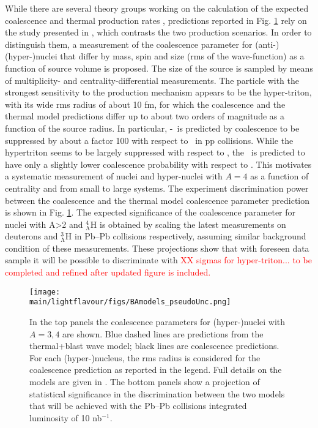 While there are several theory groups working on the calculation of the expected coalescence \cite{Scheibl:1998tk, Cho:2017dcy, Zhang:2018euf, Bazak:2018hgl, Zhao:2018lyf} and thermal production rates \cite{Andronic:2010qu, Wheaton:2004qb, Petran:2013dva}, predictions reported in Fig. \ref{fig:BAmodels} rely on the study presented in \cite{Bellini:2018epz}, which contrasts the two production scenarios. 
In order to distinguish them, a measurement of the coalescence parameter for (anti-)(hyper-)nuclei that differ by mass, spin and size (rms of the wave-function)  as a function of source volume is proposed. The size of the source is sampled by means of multiplicity- and centrality-differential measurements.
The particle with the strongest sensitivity to the production mechanism appears to be the hyper-triton, with its wide rms radius of about 10 fm, for which the coalescence and the thermal model predictions differ up to about two orders of magnitude as a function of the source radius. 
In particular, \hyp~is predicted by coalescence to be suppressed by about a factor 100 with respect to \hethree~in pp collisions. 
While the hypertriton seems to be largely suppressed with respect to \hethree, the \hypfour~is predicted to have only a slightly lower coalescence probability with respect to \hefour. This motivates a systematic measurement of nuclei and hyper-nuclei with $A=4$ as a function of centrality and from small to large systems.
The experiment discrimination power between the coalescence and the thermal model coalescence parameter prediction is shown in Fig. \ref{fig:BAmodels}.
The expected significance of the coalescence parameter for nuclei with A>2 and $\mathrm{^{4}_{\Lambda}H}$ is obtained by scaling the latest measurements on deuterons and $\mathrm{^{3}_{\Lambda}H}$ in Pb--Pb collisions respectively, assuming similar background condition of these measurements.
These projections show that with foreseen data sample it will be possible to discriminate with \textcolor{red}{XX sigmas for hyper-triton... to be completed and refined after updated figure is included.}  

\begin{figure}[t]
\begin{center}
\texttt{[image: \\main/lightflavour/figs/BAmodels\_pseudoUnc.png]}
\end{center}
\caption{
In the top panels the coalescence parameters for (hyper-)nuclei with $A = 3, 4$ are shown. Blue dashed lines are predictions from the thermal+blast wave model; black lines are coalescence predictions. For each (hyper-)nucleus, the rms radius is considered for the coalescence prediction as reported in the legend. Full details on the models are given in \cite{Bellini:2018epz}. The bottom panels show a projection of statistical significance in the discrimination between the two models that will be achieved with the Pb--Pb collisions integrated luminosity of 10 nb$^{-1}$.}
\label{fig:BAmodels}
\end{figure} 

